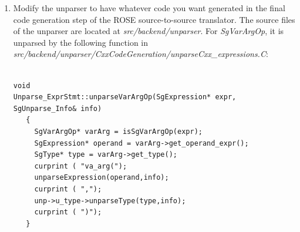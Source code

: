 \begin{enumerate}
           Here are the instructions if the new IR node is connected to legacy frontend IR node.
           Modify the legacy frontend/SAGE connection code to have the new IR node built in the
           translation from legacy frontend to SAGE III.  This step often requires a bit of expertise
           in working with the legacy frontend/SAGE connection code. In general, it requires no great
           depth of knowledge of legacy frontend.

           Two source files are usually involved: a)
           \textit{src/frontend/CxxFrontend/legacy frontend\_SAGE\_Connection/sage\_gen\_be.C}
           which converts IL tree to SAGE III AST and is derived from legacy frontend's 
           C++/C-generating back end \textit{cp\_gen\_be.c}; b)
           \textit{sage\_il\_to\_str.C} contains helper functions forming SAGE
           III AST from various legacy frontend IL entries. It is derived from legacy frontend's
           \textit{il\_to\_str.c}.  For the {\em SgVarArgOp} example, the
           following legacy frontend-SAGE connection code is needed in
           \textit{sage\_gen\_be.C}:
{\indent
{\mySmallFontSize
\begin{verbatim}
a_SgExpression_ptr
sage_gen_expr ( an_expr_node_ptr expr, 
                a_boolean need_parens, 
    ...
              )
{
  // ...
  case eok_va_arg:
  {
   sageType = sage_gen_type(expr->type);
   sageLhs = sage_gen_expr_with_parens(operand_1,NULL);
   if (isSgAddressOfOp(sageLhs) != NULL)
     sageLhs = isSgAddressOfOp(sageLhs)->get_operand();
   else
     sageLhs = new SgPointerDerefExp(sageLhs,NULL);
  //....
   result = new SgVarArgOp(sageLhs, sageType);
   goto done_with_operation;
                       }
  }
  //.....

}
\end{verbatim} 
}}

     \item Modify the unparser to have whatever code you want generated in the final
           code generation step of the ROSE source-to-source translator.
           The source files of the unparser are located at
           \textit{src/backend/unparser}. For {\em SgVarArgOp}, it is
           unparsed by the following function in
           \textit{src/backend/unparser/CxxCodeGeneration/unparseCxx\_expressions.C}:

{\indent
{\mySmallFontSize
\begin{verbatim}

void
Unparse_ExprStmt::unparseVarArgOp(SgExpression* expr, SgUnparse_Info& info)
   {
     SgVarArgOp* varArg = isSgVarArgOp(expr);
     SgExpression* operand = varArg->get_operand_expr();
     SgType* type = varArg->get_type();
     curprint ( "va_arg(");
     unparseExpression(operand,info);
     curprint ( ",");
     unp->u_type->unparseType(type,info);
     curprint ( ")");
   }
\end{verbatim} 
}}



\end{enumerate}

